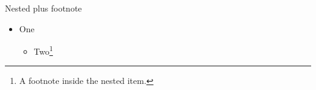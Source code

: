 \documentclass[aspectratio=169]{beamer}
\begin{document}
\begin{standardframe}{Nested plus footnote}
	\begin{itemize}
		\item One
		\begin{itemize}
			\item Two\footnote{A footnote inside the nested item.}
		\end{itemize}
	\end{itemize}
\end{standardframe}
\end{document}
